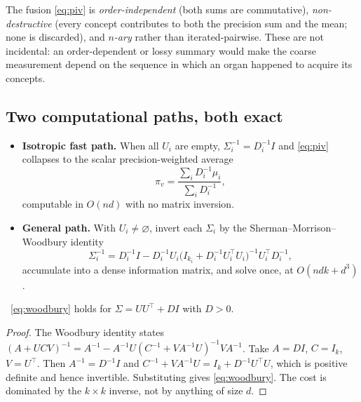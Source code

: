 \begin{remark}
The fusion \eqref{eq:piv} is \emph{order-independent} (both sums are
commutative), \emph{non-destructive} (every concept contributes to both
the precision sum and the mean; none is discarded), and \emph{$n$-ary}
rather than iterated-pairwise. These are not incidental: an
order-dependent or lossy summary would make the coarse measurement
depend on the sequence in which an organ happened to acquire its
concepts.
\end{remark}

\subsection*{Two computational paths, both exact}

\begin{itemize}
  \item \textbf{Isotropic fast path.} When all $U_i$ are empty,
  $\Sigma_i^{-1}=D_i^{-1}I$ and \eqref{eq:piv} collapses to the scalar
  precision-weighted average
  \begin{equation}\label{eq:isopath}
    \pi_v=\frac{\sum_i D_i^{-1}\mu_i}{\sum_i D_i^{-1}},
  \end{equation}
  computable in $O(nd)$ with no matrix inversion.

  \item \textbf{General path.} With $U_i\neq\varnothing$, invert each
  $\Sigma_i$ by the Sherman--Morrison--Woodbury identity
  \begin{equation}\label{eq:woodbury}
    \Sigma_i^{-1}=D_i^{-1}I
    -D_i^{-1}U_i\bigl(I_{k_i}+D_i^{-1}U_i^\top U_i\bigr)^{-1}U_i^\top D_i^{-1},
  \end{equation}
  accumulate into a dense information matrix, and solve once, at
  $O(ndk+d^3)$.
\end{itemize}

\begin{lemma}\label{lem:woodbury}
\Proved\ \eqref{eq:woodbury} holds for $\Sigma=UU^\top+DI$ with $D>0$.
\end{lemma}
\begin{proof}
The Woodbury identity states
$(A+UCV)^{-1}=A^{-1}-A^{-1}U(C^{-1}+VA^{-1}U)^{-1}VA^{-1}$. Take
$A=DI$, $C=I_k$, $V=U^\top$. Then $A^{-1}=D^{-1}I$ and
$C^{-1}+VA^{-1}U=I_k+D^{-1}U^\top U$, which is positive definite and
hence invertible. Substituting gives \eqref{eq:woodbury}. The cost is
dominated by the $k\times k$ inverse, not by anything of size $d$.
\end{proof}

